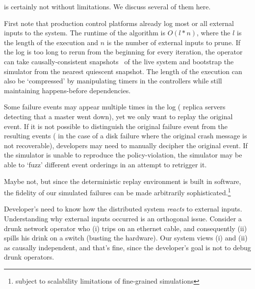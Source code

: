 \Simulator{} is certainly not without limitations. We discuss several of them
here.

First note that production control platforms already log most or all external
inputs to the system. The runtime of the algorithm is $O(l*n)$, where the $l$
is the length of the execution and $n$ is the number of external inputs to
prune. If the log is too long to rerun from the beginning for
every iteration, the operator can take causally-consistent
snapshots~\cite{Chandy:1985:DSD:214451.214456} of the
live system and bootstrap the simulator from the nearest quiescent snapshot.
The length of the execution can also be `compressed' by manipulating timers in the
controllers while still maintaining happens-before dependencies.

 Some failure events may appear
multiple times in the log (\eg{} replica servers detecting that a master went down),
yet we only want to replay the original event.
If it is not possible to distinguish the original
failure event from the resulting events (\eg{} in the case of a disk failure
where the original crash message is not recoverable), developers may need to
manually decipher the original event.
If the simulator is unable to reproduce the policy-violation,
the simulator may be able to `fuzz' different event
orderings in an attempt to retrigger it.

Maybe not, but since the deterministic replay environment
is built in software, the fidelity of our simulated failures
can be made arbitrarily sophisticated.\footnote{subject to scalability
limitations of fine-grained simulations}

 Developer's need to know how the
distributed system {\it reacts} to external inputs. Understanding why external
inputs occurred is an orthogonal issue.
Consider a drunk network operator who (i) trips on an ethernet cable, and
consequently (ii) spills his drink on a switch (busting the hardware). Our
system views (i) and (ii) as causally independent, and that's fine, since 
the developer's goal is not to debug drunk operators.

